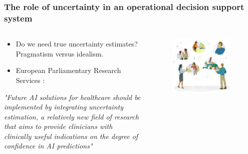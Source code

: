 \begin{frame}
    \frametitle{The role of uncertainty in an operational decision support system}
    \begin{columns}
        \begin{column}{0.6\textwidth}
            \begin{itemize}
                \item Do we need true uncertainty estimates? Pragmatism versus idealism.
                \item European Parliamentary Research Services \cite{europeanparliament_artificial_2022}:
            \end{itemize}
            \vspace{0.5em}
            \begin{center}
                {\itshape "Future AI solutions for healthcare should be implemented by integrating uncertainty estimation, a relatively new field of research that aims to provide clinicians with clinically useful indications on the degree of confidence in AI predictions"}
            \end{center}
        \end{column}
        \begin{column}{0.4\textwidth}
            \vspace{-2em}
            \begin{figure}[t]
                \centering
                \includegraphics[width=0.9\textwidth]{figures/corti_sketch_conversations.png}
            \end{figure}
        \end{column}
    \end{columns}
\end{frame}


